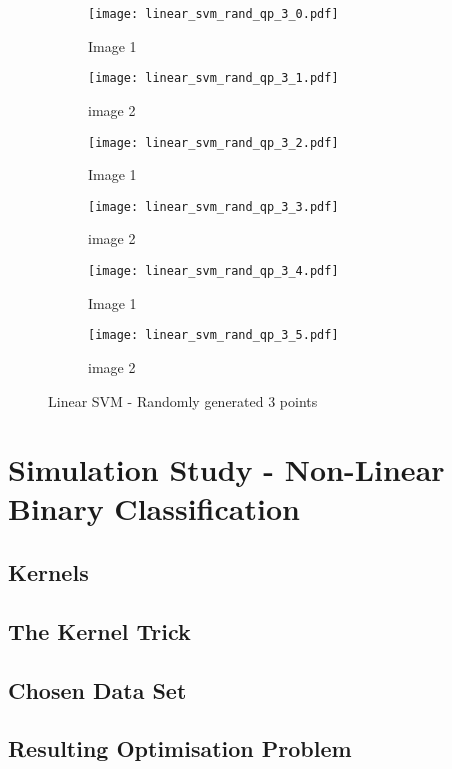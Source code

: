 \documentclass[10pt, a4paper,reqno]{amsart}
\begin{document}
\begin{figure}[H]
	\centering	
	\begin{subfigure}{0.5\textwidth}
		\centering
		\texttt{[image: linear\_svm\_rand\_qp\_3\_0.pdf]}
		\caption{Image 1}
	\end{subfigure}%
	\begin{subfigure}{0.5\textwidth}
		\centering
		\texttt{[image: linear\_svm\_rand\_qp\_3\_1.pdf]}
		\caption{image 2}
	\end{subfigure}
	\begin{subfigure}{0.5\textwidth}
		\centering
		\texttt{[image: linear\_svm\_rand\_qp\_3\_2.pdf]}
		\caption{Image 1}
	\end{subfigure}%
	\begin{subfigure}{0.5\textwidth}
		\centering
		\texttt{[image: linear\_svm\_rand\_qp\_3\_3.pdf]}
		\caption{image 2}
	\end{subfigure}
	\begin{subfigure}{0.5\textwidth}
		\centering
		\texttt{[image: linear\_svm\_rand\_qp\_3\_4.pdf]}
		\caption{Image 1}
	\end{subfigure}%
	\begin{subfigure}{0.5\textwidth}
		\centering
		\texttt{[image: linear\_svm\_rand\_qp\_3\_5.pdf]}
		\caption{image 2}
	\end{subfigure}
	\caption{Linear SVM - Randomly generated 3 points}
\end{figure}


\clearpage\section{Simulation Study - Non-Linear Binary Classification}


\subsection{Kernels}


\subsection{The Kernel Trick}


\subsection{Chosen Data Set}


\subsection{Resulting Optimisation Problem}
\end{document}
